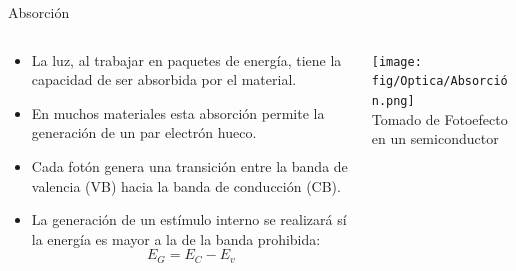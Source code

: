\documentclass[aspectratio=169]{beamer}
\begin{document}
\begin{frame}{Absorción}
    \begin{columns}[c, onlytextwidth]
        \begin{column}{0.55\textwidth}
            \begin{itemize}
                \item La luz, al trabajar en paquetes de energía, tiene la capacidad de ser absorbida por el material.
                \item En muchos materiales esta absorción permite la generación de un par electrón hueco.
                \item Cada fotón genera una transición entre la banda de valencia (VB) hacia la banda de conducción (CB).
                \item La generación de un estímulo interno se realizará sí la energía es mayor a la de la banda prohibida:
                \begin{equation*}
                    E_G=E_C-E_v
                \end{equation*}

            \end{itemize}
        \end{column}
        \begin{column}{0.45\textwidth}
            \centering
    \texttt{[image: fig/Optica/Absorción.png]}\\
            \tiny{Tomado de \cite{Fraden_2016}}
            \tiny{Fotoefecto en un semiconductor}
        \end{column}
    \end{columns}
\end{frame}
\end{document}

